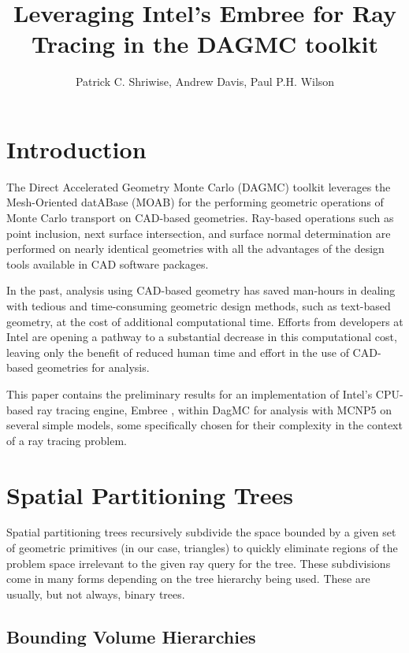 \documentclass{anstrans}
\title{Leveraging Intel's Embree for Ray Tracing in the DAGMC toolkit}
\author{Patrick C. Shriwise, Andrew Davis, Paul P.H. Wilson}
\institute{Department of Nuclear Engineering $\&$ Engineering Physics, University of Wisconsin-Madison, 1500 Engineering Dr, Madison, WI 53706, shriwise@wisc.edu}
\begin{document}
\section{Introduction}

The Direct Accelerated Geometry Monte Carlo (DAGMC) \cite{dagmc_2009} toolkit leverages the Mesh-Oriented datABase (MOAB) \cite{moab} for the performing geometric operations of Monte Carlo transport on CAD-based geometries. Ray-based operations such as point inclusion, next surface intersection, and surface normal determination are performed on nearly identical geometries with all the advantages of the design tools available in CAD software packages.

In the past, analysis using CAD-based geometry has saved man-hours in dealing with tedious and time-consuming geometric design methods, such as text-based geometry, at the cost of additional computational time. Efforts from developers at Intel are opening a pathway to a substantial decrease in this computational cost, leaving only the benefit of reduced human time and effort in the use of CAD-based geometries for analysis. 

This paper contains the preliminary results for an implementation of Intel's CPU-based ray tracing engine, Embree \cite{embree}, within DagMC for analysis with MCNP5 \cite{mcnp5} on several simple models, some specifically chosen for their complexity in the context of a ray tracing problem.

\section{Spatial Partitioning Trees}

Spatial partitioning trees recursively subdivide the space bounded by a given set of geometric primitives (in our case, triangles) to quickly eliminate regions of the problem space irrelevant to the given ray query for the tree. These subdivisions come in many forms depending on the tree hierarchy being used. These are usually, but not always, binary trees.

\subsection{Bounding Volume Hierarchies}
\end{document}

